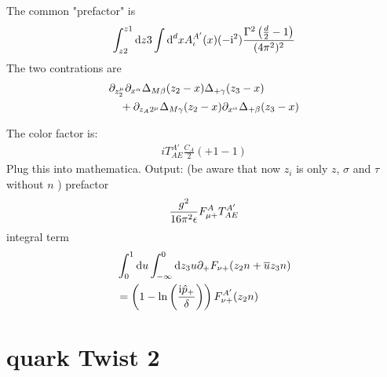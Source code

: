 The common "prefactor" is
\begin{align}
\int_{z2}^{z1} \text{d} z3 \int \text{d} ^d x A_\iota^{A'}(x) (- \text{i} ^2) \frac{\Gamma^2\left(\frac{d}{2}-1\right)}{(4\pi^2)^2}
\end{align}
The two contrations are
\begin{align}
&\partial_{z_2^{\mu}}\partial_{x^{\alpha}}\Delta_{M\beta}(z_2 -x )\Delta_{+\gamma}(z_3 -x )
\\&~~~
+\partial_{z_A2^{\mu}}\Delta_{M\gamma}(z_2 -x )\partial_{x^{\alpha}}\Delta_{+\beta}(z_3 -x )
\end{align}

The color factor is:
\begin{align}
i T^{A'}_{AE}\frac{C_A}{2}(+1-1)
\end{align}
Plug this into mathematica.
Output: (be aware that now $z_i$ is only $z$, $\sigma$ and $\tau$ without $n$ )
prefactor
\begin{align}
\frac{g^2}{16 \pi^2 \epsilon} F_{\mu +}^A T^{A'}_{AE}
\end{align}
integral term
\begin{align}
&\int_0^1 \text{d} u \int_{-\infty}^{0} \text{d} z_3 u \partial_+ F_{\nu +}(z_2 n + \overline u z_3 n)
\\
&=\left(1- \ln\left(\frac{\text{i} \hat p_{+}}{\delta}\right)\right)F_{\nu +}^{A'}(z_2n)
\end{align}

\section{quark Twist 2}


